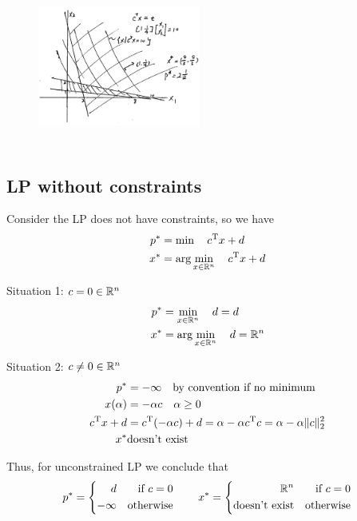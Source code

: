\begin{figure}
	\centering
	\includegraphics[width=2.1in,height=2.1in]{figures/ch06/figure5.png}
\end{figure}



\subsection{LP without constraints}

Consider the LP does not have constraints, so we have
\begin{align*}
	p^* &= \min\quad c^{{\rm T}}x+d\\
	x^* &= \arg \min_{x\in \mathbb{R}^n} \quad c^{{\rm T}}x+d
\end{align*}

\vspace{0.5cm}
Situation 1: $c = 0 \in \mathbb{R}^n$
\begin{align*}
	p^* &= \min_{x\in \mathbb{R}^n} \quad d=d\\
	x^* &= \arg \min_{x\in \mathbb{R}^n} \quad d = \mathbb{R}^n
\end{align*}

Situation 2: $c \neq 0 \in \mathbb{R}^n$
\begin{align*}
	p^* &= -\infty\quad \text{by convention if no minimum}\\
	x(\alpha) &= -\alpha c \quad \alpha \geq 0\\
	c^{{\rm T}}x + d &= c^{{\rm T}}(-\alpha c) + d = \alpha - \alpha c^{{\rm T}}c = \alpha - \alpha\Vert c\Vert^2_2\\
	x^* &\text{doesn't exist}
\end{align*}

Thus, for unconstrained LP we conclude that
$$
p^*=\left\{
\begin{aligned}
d &  & \text{if } c=0 \\
-\infty &  & \text{otherwise}
\end{aligned}
\right.
\qquad
x^*=\left\{
\begin{aligned}
\mathbb{R}^n & &\text{if } c=0 \\
\text{doesn't exist} &  & \text{otherwise}
\end{aligned}
\right.
$$

